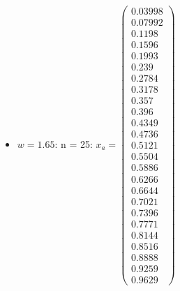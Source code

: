 \documentclass{udpreport}
\begin{document}
\begin{enumerate}
\begin{enumerate}
\begin{itemize}
\begin{itemize}
				\item $w = 1.65$:	
				n = 25: $x_{a} = \left(\begin{array}{c} 0.03998\\ 0.07992\\ 0.1198\\ 0.1596\\ 0.1993\\ 0.239\\ 0.2784\\ 0.3178\\ 0.357\\ 0.396\\ 0.4349\\ 0.4736\\ 0.5121\\ 0.5504\\ 0.5886\\ 0.6266\\ 0.6644\\ 0.7021\\ 0.7396\\ 0.7771\\ 0.8144\\ 0.8516\\ 0.8888\\ 0.9259\\ 0.9629 \end{array}\right)$

\end{itemize}
\end{itemize}
\end{enumerate}
\end{enumerate}
\end{document}
